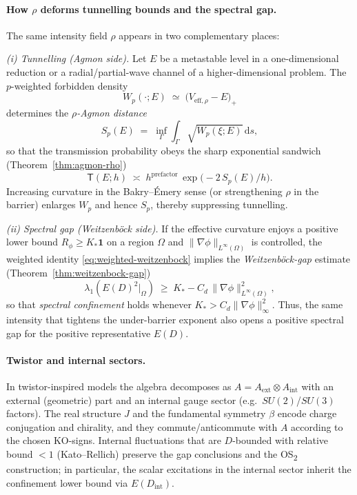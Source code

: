 \documentclass[11pt]{article}
\theoremstyle{definition}
\begin{document}
    \paragraph{How $\rho$ deforms tunnelling bounds and the spectral gap.}
    The same intensity field $\rho$ appears in two complementary places:
    
    \medskip
    \noindent\emph{(i) Tunnelling (\emph{Agmon} side).}
    Let $E$ be a metastable level in a one-dimensional reduction or a radial/partial-wave channel of a higher-dimensional problem.
    The $p$-weighted forbidden density
    \[
    W_p(\cdot;E)\;\simeq\;\big(V_{\mathrm{eff},\rho}-E\big)_+
    \]
    determines the \emph{$\rho$-Agmon distance}
    \[
    S_p(E)\;=\;\inf_\Gamma\int_\Gamma \sqrt{W_p(\xi;E)}\,\mathrm{d}s,
    \]
    so that the transmission probability obeys the sharp exponential sandwich (Theorem~\ref{thm:agmon-rho})
    \[
    \mathsf{T}(E;h)\;\asymp\; h^{\text{prefactor}}\,\exp\!\big(-2\,S_p(E)/h\big).
    \]
    Increasing curvature in the Bakry--Émery sense (or strengthening $\rho$ in the barrier) enlarges $W_p$ and hence $S_p$, thereby suppressing tunnelling.
    
    \medskip
    \noindent\emph{(ii) Spectral gap (\emph{Weitzenböck} side).}
    If the effective curvature enjoys a positive lower bound $R_\phi\ge K_\ast\mathbf{1}$ on a region $\Omega$ and $\|\nabla\phi\|_{L^\infty(\Omega)}$ is controlled, the weighted identity \eqref{eq:weighted-weitzenbock} implies the \emph{Weitzenböck-gap} estimate (Theorem~\ref{thm:weitzenbock-gap})
    \[
    \lambda_1\!\left(E(D)^2\!\big\vert_{\Omega}\right)\;\ge\;K_\ast - C_d\,\|\nabla\phi\|_{L^\infty(\Omega)}^2,
    \]
    so that \emph{spectral confinement} holds whenever $K_\ast>C_d\|\nabla\phi\|^2_\infty$.
    Thus, the same intensity that tightens the under-barrier exponent also opens a positive spectral gap for the positive representative $E(D)$.
    
    \paragraph{Twistor and internal sectors.}
    In twistor-inspired models the algebra decomposes as $A=A_{\mathrm{ext}}\otimes A_{\mathrm{int}}$ with an external (geometric) part and an internal gauge sector (e.g.\ $SU(2)$/$SU(3)$ factors).
    The real structure $J$ and the fundamental symmetry $\beta$ encode charge conjugation and chirality, and they commute/anticommute with $A$ according to the chosen KO-signs.
    Internal fluctuations that are $D$-bounded with relative bound $<1$ (Kato--Rellich) preserve the gap conclusions and the OS\textsubscript{2} construction; in particular, the scalar excitations in the internal sector inherit the confinement lower bound via $E(D_{\mathrm{int}})$.
    
\end{document}

